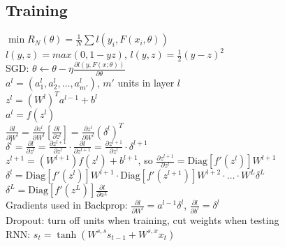 \subsection*{Training}
$\min R_N(\theta) = \frac{1}{N}\sum l(y_i, F(x_i, \theta))$\\
$l(y, z) = max(0, 1-yz)$, $l(y, z) = \frac{1}{2}(y-z)^2$\\
SGD: $\theta \leftarrow \theta - \eta \frac{\partial l(y, F(x; \theta))}{\partial \theta}$\\
$a^l = (a_1^l, a_2^l, \dots, a_{m'}^l)$, $m'$ units in layer $l$\\
$z^l = (W^l)^T a^{l-1} + b^l$\\
$a^l = f(z^l)$\\
$\frac{\partial l}{\partial W^l} = \frac{\partial z^l}{\partial W^l}[\frac{\partial l}{\partial z^l}] = \frac{\partial z^l}{\partial W^l}(\delta^l)^T$\\
$\delta^l = \frac{\partial l}{\partial z^l} = \frac{\partial z^{l+1}}{\partial z^l}\cdot\frac{\partial l}{\partial z^{l+1}} = \frac{\partial z^{l+1}}{\partial z^l} \cdot \delta^{l+1}$\\
$z^{l+1} = (W^{l+1})f(z^l) + b^{l+1}$, so $\frac{\partial z^{l+1}}{\partial z^l} = \text{Diag}[f'(z^l)]W^{l+1}$\\
$\delta^l = \text{Diag}[f'(z^l)]W^{l+1}\cdot\text{Diag}[f'(z^{l+1})]W^{l+2} \cdot \dots \cdot W^{L}\delta^L$\\
$\delta^L = \text{Diag}[f'(z^L)]\frac{\partial l}{\partial a^L}$\\
Gradients used in Backprop: $\frac{\partial l}{\partial W^l} = a^{l-1}\delta^l$, $\frac{\partial l}{\partial b^l} = \delta^l$\\
Dropout: turn off units when training, cut weights when testing\\
RNN: $s_t = \tanh(W^{s,s}s_{t-1} + W^{s, x}x_t)$\\
